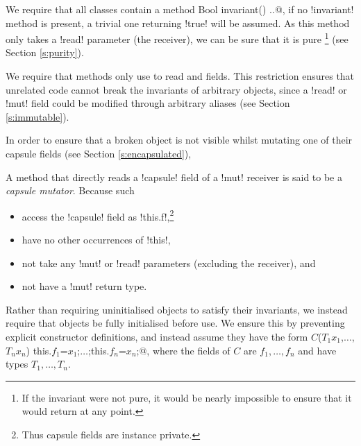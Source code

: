 We require that all classes contain a \Q@read method Bool invariant() {..}@, if no \Q!invariant! method is present, a trivial one returning \Q!true! will be assumed. As this method only takes a \Q!read! parameter (the receiver), we can be sure that it is pure \footnote{If the invariant were not pure, it would be nearly impossible to ensure that it would return \Q@true@ at any point.} (see Section \ref{s:purity}).

We require that \Q@invariant@ methods only use \Q@this@ to read \Q@imm@ and \Q@capsule@ fields. This restriction ensures that unrelated code cannot break the invariants of arbitrary objects, since a \Q!read! or \Q!mut! field could be modified through arbitrary aliases (see Section \ref{s:immutable}). 

In order to ensure that a broken object is not visible whilst mutating one of their capsule fields (see Section \ref{s:encapsulated}), 



A method that directly reads a \Q!capsule! field of a \Q!mut! receiver is said to be a \emph{capsule mutator}. Because such 
\begin{itemize}
\item access the \Q!capsule! field as \Q!this.f!,\footnote{Thus capsule fields are instance private.}
\item have no other occurrences of \Q!this!,
\item not take any \Q!mut! or \Q!read! parameters (excluding the receiver), and
\item not have a \Q!mut! return type.
\end{itemize}
%
Rather than requiring uninitialised objects to satisfy their invariants, we instead require that objects be fully initialised before use. We ensure this by preventing explicit constructor definitions, and instead assume they have the form \Q@$C$($T_1 x_1$,$\ldots$,$T_n x_n$) {this.$f_1$=$x_1$;$\ldots$;this.$f_n$=$x_n$;}@, where the fields of $C$ are $f_1,\ldots,f_n$ and have types $T_1,\ldots,T_n$.

